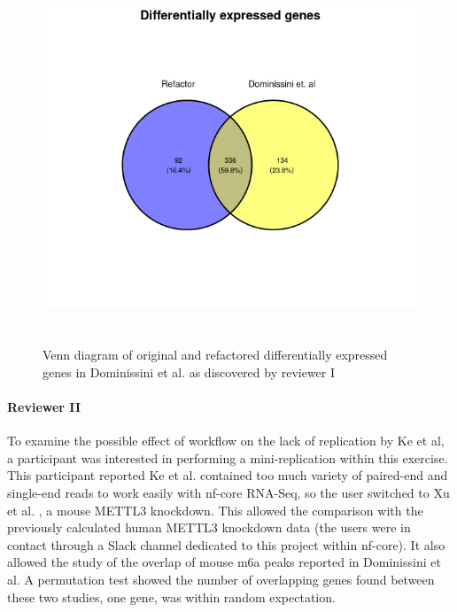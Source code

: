 \documentclass{drexelthesis}
\begin{document}
\begin{figure}[h!]
	\centering
	\includegraphics[width=13.76cm,height=11.05cm]{./images/degenes.png}
	\caption{Venn diagram of original and refactored differentially expressed genes in Dominissini et al. as discovered by reviewer I}
	\label{degenesinline}
\end{figure}


\paragraph{Reviewer II}

To examine the possible effect of workflow on the lack of replication by Ke et al, a participant was interested in performing a mini-replication within this exercise. This participant reported Ke et al. contained too much variety of paired-end and single-end reads to work easily with nf-core RNA-Seq, so the user switched to Xu et al. \cite{Xu2021-dx}, a mouse METTL3 knockdown. This allowed the comparison with the previously calculated human METTL3 knockdown data (the users were in contact through a Slack channel dedicated to this project within nf-core). It also allowed the study of the overlap of mouse m6a peaks reported in Dominissini et al. A permutation test showed the number of overlapping genes found between these two studies, one gene, was within random expectation.
\end{document}
